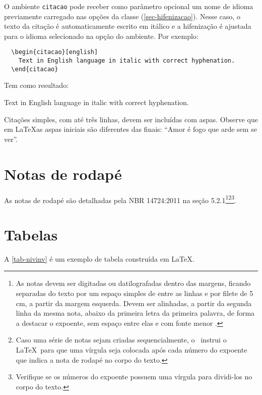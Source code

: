 O ambiente \texttt{citacao} pode receber como parâmetro opcional um nome de idioma previamente carregado nas opções da classe (\autoref{sec-hifenizacao}). Nesse caso, o texto da citação é automaticamente escrito em itálico e a hifenização é ajustada para o idioma selecionado na opção do ambiente. Por exemplo:

\begin{verbatim}
  \begin{citacao}[english]
    Text in English language in italic with correct hyphenation.
  \end{citacao}
\end{verbatim}

Tem como resultado:

\begin{citacao}[english]
  Text in English language in italic with correct hyphenation.
\end{citacao}

Citações simples, com até três linhas, devem ser incluídas com aspas. Observe que em \LaTeX as aspas iniciais são diferentes das finais: ``Amor é fogo que arde sem se ver''.

\section{Notas de rodapé}
As notas de rodapé são detalhadas pela NBR 14724:2011 na seção 5.2.1\footnote{As notas devem ser digitadas ou datilografadas dentro das margens, ficando separadas do texto por um espaço simples de entre as linhas e por filete de 5 cm, a partir da margem esquerda. Devem ser alinhadas, a partir da segunda linha da mesma nota, abaixo da primeira letra da primeira palavra, de forma a destacar o expoente, sem espaço entre elas e com fonte menor .}\footnote{Caso uma série de notas sejam criadas sequencialmente, o \abnTeX\ instrui o \LaTeX\ para que uma vírgula seja colocada após cada número do expoente que indica a nota de rodapé no corpo do texto.}\footnote{Verifique se os números do expoente possuem uma vírgula para dividi-los no corpo do texto.}. 

\section{Tabelas}
A \autoref{tab-nivinv} é um exemplo de tabela construída em \LaTeX.

